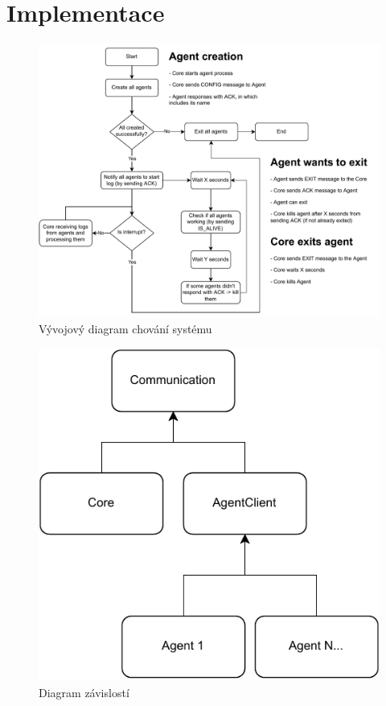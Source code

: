 \chapter{Implementace}
\begin{figure}[hbt]
	\centering
	\includegraphics[width=\textwidth]{diagrams/flowchart/flowchart.pdf}
	\caption{Vývojový diagram chování systému}
\end{figure}
\begin{figure}[hbt]
	\centering
	\includegraphics[width=\textwidth]{diagrams/dependency-diagram/dependency_diagram.pdf}
	\caption{Diagram závislostí}
\end{figure}

